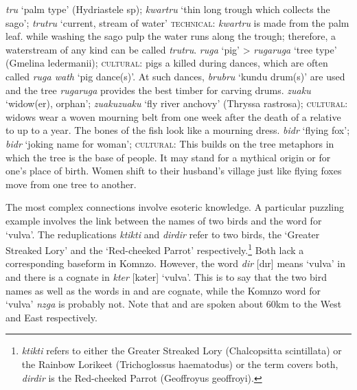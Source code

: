 \begin{exe}
\ex
\label{ex639}
\begin{xlist}
	\ex \label{ex640} \emph{tru} `palm type' (Hydriastele sp); \emph{kwartru} `thin long trough which collects the sago'; \emph{trutru} `current, stream of water' \textsc{technical:} \emph{kwartru} is made from the palm leaf. while washing the sago pulp the water runs along the trough; therefore, a waterstream of any kind can be called \emph{trutru}.
	\ex \label{ex641} \emph{ruga} `pig' > \emph{rugaruga} `tree type' (Gmelina ledermanii); \textsc{cultural:} pigs a killed during dances, which are often called \emph{ruga wath} `pig dance(s)'. At such dances, \emph{brubru} `kundu drum(s)' are used and the tree \emph{rugaruga} provides the best timber for carving drums.
	\ex \label{ex642} \emph{zuaku} `widow(er), orphan'; \emph{zuakuzuaku} `fly river anchovy' (Thryssa rastrosa); \textsc{cultural:} widows wear a woven mourning belt from one week after the death of a relative to up to a year. The bones of the fish look like a mourning dress.
	\ex \label{ex643} \emph{bidr} `flying fox'; \emph{bidr} `joking name for woman'; \textsc{cultural:} This builds on the tree metaphors in which the tree is the base of people. It may stand for a mythical origin or for one's place of birth. Women shift to their husband's village just like flying foxes move from one tree to another.
\end{xlist}
\end{exe}%

The most complex connections involve esoteric knowledge. A particular puzzling example involves the link between the names of two birds and the word for `vulva'. The reduplications \emph{ktikti} and \emph{dirdir} refer to two birds, the  `Greater Streaked Lory' and the `Red-cheeked Parrot' respectively.\footnote{\emph{ktikti} refers to either the Greater Streaked Lory (Chalcopsitta scintillata) or the Rainbow Lorikeet (Trichoglossus haematodus) or the term covers both, \emph{dirdir} is the Red-cheeked Parrot (Geoffroyus geoffroyi).} Both lack a corresponding baseform in Komnzo. However, the word \emph{dir} [dır] means `vulva' in  and there is a cognate in  \emph{kter} [kəter] `vulva'. This is to say that the two bird names as well as the words in  and  are cognate, while the Komnzo word for `vulva' \emph{nzga} is probably not. Note that  and  are spoken about 60km to the West and East respectively.%

